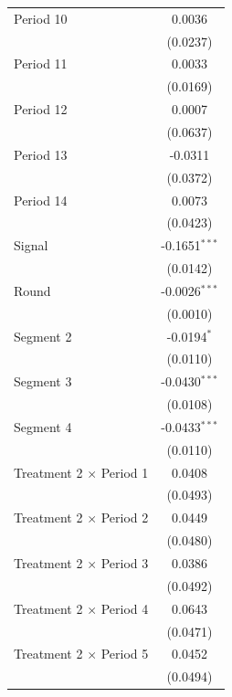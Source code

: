 \begin{longtable}{lc}
   Period 10                       & 0.0036\\
                                   & (0.0237)\\
   Period 11                       & 0.0033\\
                                   & (0.0169)\\
   Period 12                       & 0.0007\\
                                   & (0.0637)\\
   Period 13                       & -0.0311\\
                                   & (0.0372)\\
   Period 14                       & 0.0073\\
                                   & (0.0423)\\
   Signal                          & -0.1651$^{***}$\\
                                   & (0.0142)\\
   Round                           & -0.0026$^{***}$\\
                                   & (0.0010)\\
   Segment 2                       & -0.0194$^{*}$\\
                                   & (0.0110)\\
   Segment 3                       & -0.0430$^{***}$\\
                                   & (0.0108)\\
   Segment 4                       & -0.0433$^{***}$\\
                                   & (0.0110)\\
   Treatment 2 $\times$ Period 1   & 0.0408\\
                                   & (0.0493)\\
   Treatment 2 $\times$ Period 2   & 0.0449\\
                                   & (0.0480)\\
   Treatment 2 $\times$ Period 3   & 0.0386\\
                                   & (0.0492)\\
   Treatment 2 $\times$ Period 4   & 0.0643\\
                                   & (0.0471)\\
   Treatment 2 $\times$ Period 5   & 0.0452\\
                                   & (0.0494)\\

\end{longtable}
